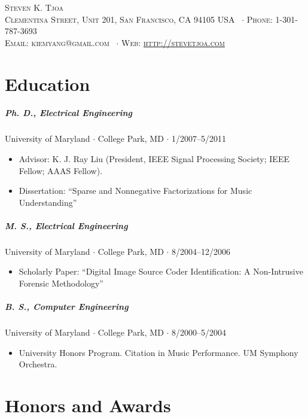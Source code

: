 \documentclass[10pt,letterpaper]{article}
\newcommand{\namestyle}{\Huge \scshape}
\newcommand{\addressstyle}{\color{addresscolor} \footnotesize \rmfamily \upshape}
\begin{document}
\begin{center}
    \namestyle Steven K. Tjoa \\[0.3em]
    \addressstyle 19 Clementina Street, Unit 201, San Francisco, CA 94105 USA \ $\cdot$ Phone: 1-301-787-3693\\
    Email: kiemyang@gmail.com \ $\cdot$ Web: \url{http://stevetjoa.com}
\end{center}

\small


\section*{Education}

\subparagraph{Ph. D., Electrical Engineering}
University of Maryland $\cdot$ College Park, MD $\cdot$ 1/2007--5/2011
\begin{itemize}
    \item Advisor: K. J. Ray Liu (President, IEEE Signal Processing Society; IEEE Fellow; AAAS Fellow).
    \item Dissertation: ``Sparse and Nonnegative Factorizations for Music Understanding''
\end{itemize}

\subparagraph{M. S., Electrical Engineering}
University of Maryland $\cdot$ College Park, MD $\cdot$ 8/2004--12/2006
\begin{itemize}
    \item Scholarly Paper: ``Digital Image Source Coder Identification: A Non-Intrusive Forensic Methodology''
\end{itemize}

\subparagraph{B. S., Computer Engineering}
University of Maryland $\cdot$ College Park, MD $\cdot$ 8/2000--5/2004
\begin{itemize}
    \item University Honors Program.  Citation in Music Performance.  UM Symphony Orchestra.
\end{itemize}


\section*{Honors and Awards}
\end{document}
